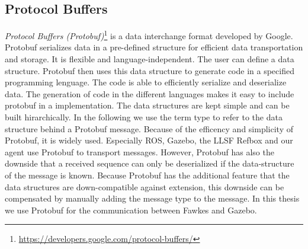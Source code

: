 \subsection{Protocol Buffers}
\textit{Protocol Buffers (Protobuf)}\footnote{\url{https://developers.google.com/protocol-buffers/}} is a data interchange format developed by Google. Protobuf serializes data in a pre-defined structure for efficient data transportation and storage. It is flexible and language-independent. The user can define a data structure. Protobuf then uses this data structure to generate code in a specified programming lenguage. The code is able to efficiently serialize and deserialize data. The generation of code in the different languages makes it easy to include protobuf in a implementation. The data structures are kept simple and can be built hirarchically. In the following we use the term type to refer to the data structure behind a Protobuf message. Because of the efficency and simplicity of Protobuf, it is widely used. Especially ROS, Gazebo, the LLSF Refbox and our agent use Protobuf to transport messages. However, Protobuf has also the downside that a received sequence can only be deserialized if the data-structure of the message is known. Because Protobuf has the additional feature that the data structures are down-compatible against extension, this downside can be compensated by manually adding the message type to the message. In this thesis we use Protobuf for the communication between Fawkes and Gazebo.

